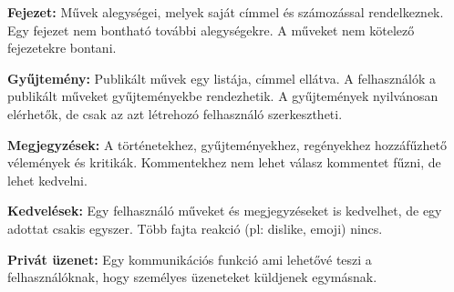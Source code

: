 \textbf{Fejezet:}  Művek alegységei, melyek saját címmel és számozással rendelkeznek. Egy fejezet nem bontható további alegységekre. A műveket nem kötelező fejezetekre bontani. 

\textbf{Gyűjtemény:} Publikált művek egy listája, címmel ellátva. A felhasználók a publikált műveket gyűjteményekbe rendezhetik. A gyűjtemények nyilvánosan elérhetők, de csak az azt létrehozó felhasználó szerkesztheti.

\textbf{Megjegyzések:} A történetekhez, gyűjteményekhez, regényekhez hozzáfűzhető vélemények és kritikák. Kommentekhez nem lehet válasz kommentet fűzni, de lehet kedvelni.

\textbf{Kedvelések:} Egy felhasználó műveket és megjegyzéseket is kedvelhet, de egy adottat csakis egyszer. Több fajta reakció (pl: dislike, emoji) nincs.

\textbf{Privát üzenet:} Egy kommunikációs funkció ami lehetővé teszi a felhasználóknak, hogy személyes üzeneteket küldjenek egymásnak.